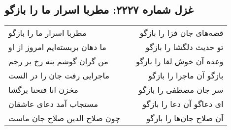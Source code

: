 \begin{center}
\section*{غزل شماره ۲۲۲۷: مطربا اسرار ما را بازگو}
\label{sec:2227}
\begin{longtable}{l p{0.5cm} r}
مطربا اسرار ما را بازگو
&&
قصه‌های جان فزا را بازگو
\\
ما دهان بربسته‌ایم امروز از او
&&
تو حدیث دلگشا را بازگو
\\
من گران گوشم بنه رخ بر رخم
&&
وعده آن خوش لقا را بازگو
\\
ماجرایی رفت جان را در الست
&&
بازگو آن ماجرا را بازگو
\\
مخزن انا فتحنا برگشا
&&
سر جان مصطفی را بازگو
\\
مستجاب آمد دعای عاشقان
&&
ای دعاگو آن دعا را بازگو
\\
چون صلاح الدین صلاح جان ماست
&&
آن صلاح جان‌ها را بازگو
\\
\end{longtable}
\end{center}
